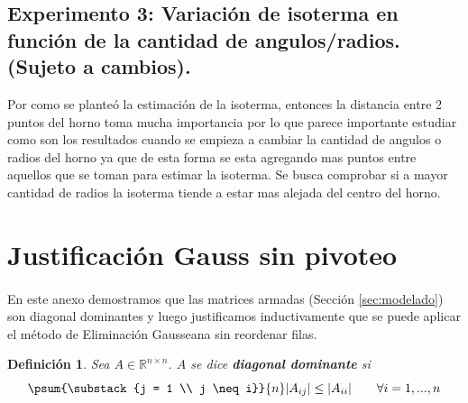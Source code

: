 \documentclass[12pt]{article}
\newtheorem{defi}{Definición}
\begin{document}
\subsection{Experimento 3: Variación de isoterma en función de la cantidad de angulos/radios. (Sujeto a cambios).}
Por como se planteó la estimación de la isoterma, entonces la distancia entre 2  puntos del horno toma mucha importancia por lo que parece importante estudiar como son los resultados cuando se empieza a cambiar la cantidad de angulos o radios del horno ya que de esta forma se esta agregando mas puntos entre aquellos que se toman para estimar la isoterma. Se busca comprobar si a mayor cantidad de radios la isoterma tiende a estar mas alejada del centro del horno.

\appendix %
\renewcommand{\thesection}{\Roman{section}}

\section{Justificación Gauss sin pivoteo} 
\label{appendix:justificacion}

\paragraph{} En este anexo demostramos que las matrices armadas (Sección \ref{sec:modelado}) son diagonal dominantes y luego justificamos inductivamente que se puede aplicar el método de Eliminación Gausseana sin reordenar filas.

\begin{defi}
Sea \(A \in \mathbb{R}^{n \times n}\). \(A\) se dice \textbf{diagonal dominante} si 
\[
  \psum{\substack{j = 1 \\ j \neq i}}{n}|A_{ij}| \leq  |A_{ii}| \qquad \forall i = 1, ..., n
\]
\end{defi}
\end{document}
